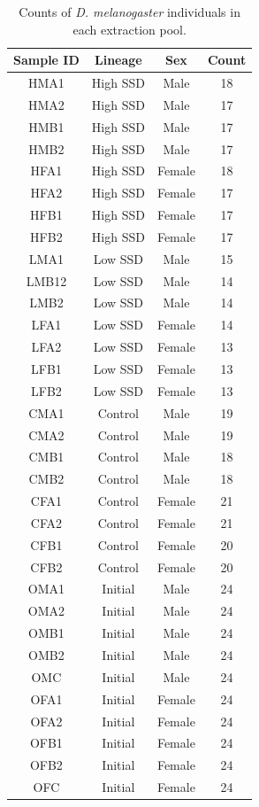\documentclass[12pt,reqno,oneside]{report}
\begin{document}
\begin{table}
    \centering
    \caption{Counts of \textit{D. melanogaster} individuals in each extraction pool.}
    \begin{tabular}{cccc}
        Sample ID & Lineage & Sex & Count \\ \hline
        HMA1 & High SSD & Male & 18 \\ \hline
        HMA2 & High SSD & Male & 17 \\ \hline
        HMB1 & High SSD & Male & 17 \\ \hline
        HMB2 & High SSD & Male & 17 \\ \hline
        HFA1 & High SSD & Female & 18 \\ \hline
        HFA2 & High SSD & Female & 17 \\ \hline
        HFB1 & High SSD & Female & 17 \\ \hline
        HFB2 & High SSD & Female & 17 \\ \hline
        LMA1 & Low SSD & Male & 15 \\ \hline
        LMB12 & Low SSD & Male & 14 \\ \hline
        LMB2 & Low SSD & Male & 14 \\ \hline
        LFA1 & Low SSD & Female & 14 \\ \hline
        LFA2 & Low SSD & Female & 13 \\ \hline
        LFB1 & Low SSD & Female & 13 \\ \hline
        LFB2 & Low SSD & Female & 13 \\ \hline
        CMA1 & Control & Male & 19 \\ \hline
        CMA2 & Control & Male &	19 \\ \hline
        CMB1 & Control & Male &	18 \\ \hline
        CMB2 & Control & Male &	18 \\ \hline
        CFA1 & Control & Female & 21 \\ \hline
        CFA2 & Control & Female & 21 \\ \hline
        CFB1 & Control & Female & 20 \\ \hline
        CFB2 & Control & Female & 20 \\ \hline
        OMA1 & Initial & Male &	24 \\ \hline
        OMA2 & Initial & Male &	24 \\ \hline
        OMB1 & Initial & Male &	24 \\ \hline
        OMB2 & Initial & Male &	24 \\ \hline
        OMC	& Initial & Male &	24 \\ \hline
        OFA1 & Initial & Female & 24 \\ \hline
        OFA2 & Initial & Female & 24 \\ \hline
        OFB1 & Initial & Female & 24 \\ \hline
        OFB2 & Initial & Female & 24 \\ \hline
        OFC	& Initial & Female & 24 \\ \hline
    \end{tabular}
    \label{tab:poolcounts}
\end{table}
\clearpage
\end{document}
